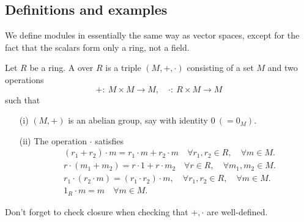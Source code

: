 \documentclass[egregdoesnotlikesansseriftitles,a4paper]{scrartcl}
\begin{document}
\subsection{Definitions and examples}
We define modules in essentially the same way as vector spaces, except for the fact that the scalars form only a ring, not a field.
\begin{definition*}[Module]
       Let $R$ be a ring. A  over $R$ is a triple $(M, +, \cdot )$ consisting of a set $M$ and two operations \[
       +: \ M \times M \rightarrow M, \quad \cdot : \ R \times M \rightarrow M
       \] such that
       \begin{itemize}
             \item[(i)] $(M,+)$ is an abelian group, say with identity $0 \ (=0_{M})$.
             \item[(ii)] The operation $\cdot $ satisfies
             \begin{align*}
                   &(r_1 +r_2 ) \cdot m = r_1 \cdot m +r_2 \cdot m \quad \forall r_1 ,r_2 \in R,\quad \forall  m \in M. \\
                  & r \cdot (m_1 +m_2 )= r \cdot 1 +r \cdot m_2 \quad \forall r \in R,\quad \forall m_1 ,  m_2 \in M.\\
                   &r_1 \cdot (r_2 \cdot m)= (r_1 \cdot r_2 )\cdot m, \quad \forall r_1 ,r_2 \in R,\quad \forall  m \in M. \\
                   &1_{R}\cdot m=m \quad \forall m \in M.
             \end{align*} 
       \end{itemize}
       \begin{remark}
              Don't forget to check closure when checking that $+, \cdot $ are well-defined. 
       \end{remark}
\end{definition*}
\end{document}

